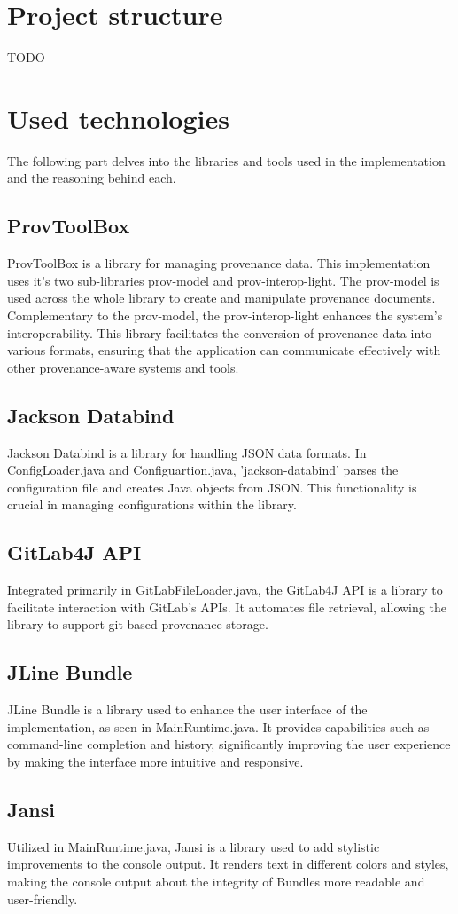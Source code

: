 \documentclass[
  digital,     %
  oneside,     %
  nosansbold,  %
  nocolorbold, %
  lof,         %
  lot,         %
]{fithesis4}
\begin{document}
\section{Project structure}
TODO

\section{Used technologies}
The following part delves into the libraries and tools used in the implementation and the reasoning behind each.
\subsection{ProvToolBox}
ProvToolBox is a library for managing provenance data. This implementation uses it's two sub-libraries prov-model and prov-interop-light.  
The prov-model is used across the whole library to create and manipulate provenance documents.
Complementary to the prov-model, the prov-interop-light enhances the system's interoperability. This library facilitates the conversion of provenance data into various formats, ensuring that the application can communicate effectively with other provenance-aware systems and tools.
\subsection{Jackson Databind}
Jackson Databind is a library for handling JSON data formats. In ConfigLoader.java and Configuartion.java, 'jackson-databind' parses the configuration file and creates Java objects from JSON. This functionality is crucial in managing configurations within the library.
\subsection{GitLab4J API}
Integrated primarily in GitLabFileLoader.java, the GitLab4J API is a library to facilitate interaction with GitLab's APIs. It automates file retrieval, allowing the library to support git-based provenance storage.
\subsection{JLine Bundle}
JLine Bundle is a library used to enhance the user interface of the implementation, as seen in MainRuntime.java. It provides capabilities such as command-line completion and history, significantly improving the user experience by making the interface more intuitive and responsive.
\subsection{Jansi}
Utilized in MainRuntime.java, Jansi is a library used to add stylistic improvements to the console output. It renders text in different colors and styles, making the console output about the integrity of Bundles more readable and user-friendly.
\end{document}

